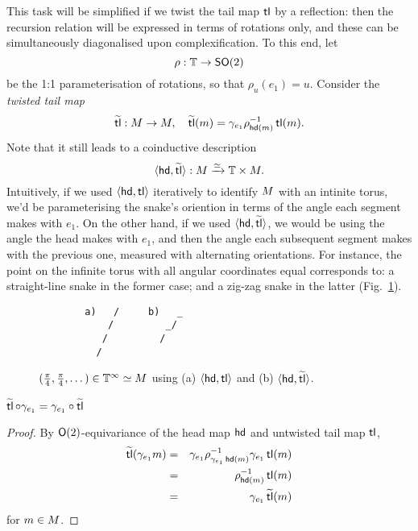 This task will be simplified if we twist the tail map $\operatorname{\mathsf{tl}}$ by a reflection:
then the recursion relation will be expressed in terms of rotations only,
and these can be simultaneously diagonalised upon complexification. To this
end, let
\[
  \rho : {\mathbb{T}} \to \mathsf{SO}(2)
\]
be the 1:1 parameterisation of rotations, so that $\rho_u(e_1)=u$. Consider the
\emph{twisted tail map}
\[
        \operatorname{\widetilde{\operatorname{\mathsf{tl}}}} : M\to M,\quad  \operatorname{\widetilde{\operatorname{\mathsf{tl}}}}(m) = \gamma_{e_1} \rho_{\operatorname{\mathsf{hd}}(m)}^{-1} \operatorname{\mathsf{tl}}(m).
\]
Note that it still leads to a coinductive description
\[
        \langle\operatorname{\mathsf{hd}}, \operatorname{\widetilde{\operatorname{\mathsf{tl}}}}\rangle : M \xrightarrow{\simeq} {\mathbb{T}}\times M.
\]
Intuitively, if we used $\langle\operatorname{\mathsf{hd}},\operatorname{\mathsf{tl}}\rangle$ iteratively to identify $M$ with an intinite
torus, we'd be parameterising the snake's oriention in terms of the angle each
segment makes with $e_1$. On the other hand, if we used $\langle\operatorname{\mathsf{hd}},\operatorname{\widetilde{\operatorname{\mathsf{tl}}}}\rangle$, we would be
using the angle the head makes with $e_1$, and then the angle each subsequent segment
makes with the previous one, measured with alternating orientations. For instance,
the point on the infinite torus with all angular coordinates equal corresponds to:
a straight-line snake in the former case; and a zig-zag snake in the latter (Fig.~\ref{fig:param}). 

\begin{figure} %
\begin{verbatim}
        a)   /     b)   _   
            /         _/
           /         /
          /               
\end{verbatim}
\caption{
        $(\frac{\pi}{4},\frac{\pi}{4},\dots) \in {\mathbb{T}}^\infty\simeq M$
        using (a) $\langle\operatorname{\mathsf{hd}},\operatorname{\mathsf{tl}}\rangle$ and (b) $\langle\operatorname{\mathsf{hd}},\operatorname{\widetilde{\operatorname{\mathsf{tl}}}}\rangle$.
\label{fig:param}}
\end{figure}

\begin{lem}\label{lem:ttl-refl}
        $\operatorname{\widetilde{\operatorname{\mathsf{tl}}}}\circ\gamma_{e_1} = \gamma_{e_1}\circ\operatorname{\widetilde{\operatorname{\mathsf{tl}}}}$
\end{lem}
\begin{proof}
By $\mathsf{O}(2)$-equivariance of the head map $\operatorname{\mathsf{hd}}$ and untwisted tail map $\operatorname{\mathsf{tl}}$,
\begin{eqnarray*}
        \operatorname{\widetilde{\operatorname{\mathsf{tl}}}}(\gamma_{e_1}m) &=& \gamma_{e_1} \rho_{\gamma_{e_1} \operatorname{\mathsf{hd}}(m)}^{-1} \gamma_{e_1} \operatorname{\mathsf{tl}}(m) \\
                            &=& \rho_{\operatorname{\mathsf{hd}}(m)}^{-1} \operatorname{\mathsf{tl}}(m) \\
                            &=& \gamma_{e_1} \operatorname{\widetilde{\operatorname{\mathsf{tl}}}}(m)
 \end{eqnarray*}
for $m\in M$.
\end{proof}

